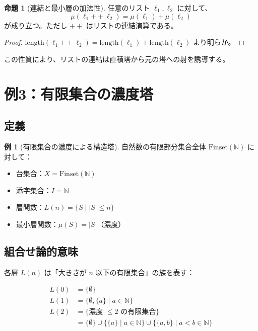 \documentclass[a4paper,12pt]{ltjsarticle}
\theoremstyle{definition}
\newtheorem{example}[definition]{例}
\newtheorem{proposition}[definition]{命題}
\begin{document}
\begin{proposition}[連結と最小層の加法性]
\label{prop:list-concat}
任意のリスト $\ell_1, \ell_2$ に対して、
\[
\mu(\ell_1 \mathbin{++} \ell_2) = \mu(\ell_1) + \mu(\ell_2)
\]
が成り立つ。ただし $++$ はリストの連結演算である。
\end{proposition}

\begin{proof}
$\mathrm{length}(\ell_1 \mathbin{++} \ell_2) = \mathrm{length}(\ell_1) + \mathrm{length}(\ell_2)$ より明らか。
\end{proof}

この性質により、リストの連結は直積塔から元の塔への射を誘導する。

\section{例3：有限集合の濃度塔}

\subsection{定義}

\begin{example}[有限集合の濃度による構造塔]
\label{ex:finset-card}
自然数の有限部分集合全体 $\mathrm{Finset}(\mathbb{N})$ に対して：
\begin{itemize}
\item 台集合：$X = \mathrm{Finset}(\mathbb{N})$
\item 添字集合：$I = \mathbb{N}$
\item 層関数：$L(n) = \{S \mid |S| \leq n\}$
\item 最小層関数：$\mu(S) = |S|$（濃度）
\end{itemize}
\end{example}

\subsection{組合せ論的意味}

各層 $L(n)$ は「大きさが $n$ 以下の有限集合」の族を表す：

\begin{align*}
L(0) &= \{\emptyset\} \\
L(1) &= \{\emptyset, \{a\} \mid a \in \mathbb{N}\} \\
L(2) &= \{\text{濃度 } \leq 2 \text{ の有限集合}\} \\
&= \{\emptyset\} \cup \{\{a\} \mid a \in \mathbb{N}\} \cup \{\{a, b\} \mid a < b \in \mathbb{N}\}
\end{align*}
\end{document}
